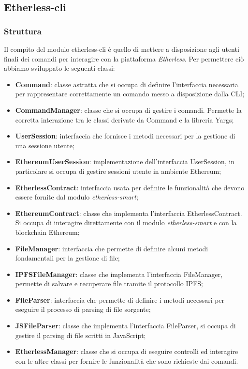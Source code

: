 \subsection{Etherless-cli}
\subsubsection{Struttura}
Il compito del modulo etherless-cli è quello di mettere a disposizione agli utenti finali dei comandi per interagire con la piattaforma \textit{Etherless}. Per permettere ciò abbiamo sviluppato le seguenti classi:
\begin{itemize}
	\item \textbf{Command}: classe astratta che si occupa di definire l'interfaccia necessaria per rappresentare correttamente un comando messo a disposizione dalla CLI;
	\item \textbf{CommandManager}: classe che si occupa di gestire i comandi. Permette la corretta interazione tra le classi derivate da Command e la libreria Yargs;
	\item \textbf{UserSession}: interfaccia che fornisce i metodi necessari per la gestione di una sessione utente; 
	\item \textbf{EthereumUserSession}: implementazione dell'interfaccia UserSession, in particolare si occupa di gestire sessioni utente in ambiente Ethereum; 
	\item \textbf{EtherlessContract}: interfaccia usata per definire le funzionalità che devono essere fornite dal modulo \textit{etherless-smart}; 
	\item \textbf{EthereumContract}: classe che implementa l'interfaccia EtherlessContract. Si occupa di interagire direttamente con il modulo \textit{etherless-smart} e con la blockchain Ethereum; 
	\item \textbf{FileManager}: interfaccia che permette di definire alcuni metodi fondamentali per la gestione di file; 
	\item \textbf{IPFSFileManager}: classe che implementa l'interfaccia FileManager, permette di salvare e recuperare file tramite il protocollo IPFS; 
	\item \textbf{FileParser}: interfaccia che permette di definire i metodi necessari per eseguire il processo di parsing di file sorgente; 
	\item \textbf{JSFileParser}: classe che implementa l'interfaccia FileParser, si occupa di gestire il parsing di file scritti in JavaScript; 
	\item \textbf{EtherlessManager}: classe che si occupa di eseguire controlli ed interagire con le altre classi per fornire le funzionalità che sono richieste dai comandi. 
\end{itemize}

